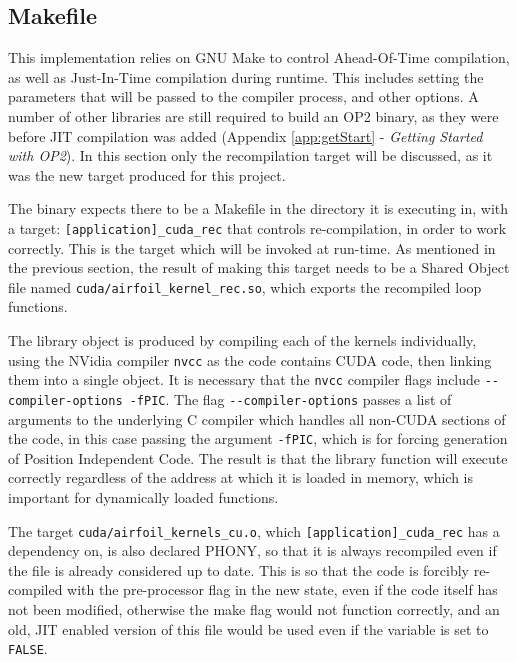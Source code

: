\subsection{Makefile}
\label{ss:make}
This implementation relies on GNU Make to control Ahead-Of-Time compilation, as well as Just-In-Time compilation during runtime. This includes setting the parameters that will be passed to the compiler process, and other options. A number of other libraries are still required to build an OP2 binary, as they were before JIT compilation was added (Appendix \ref{app:getStart} - \textit{Getting Started with OP2}). In this section only the recompilation target will be discussed, as it was the new target produced for this project.
\par
The binary expects there to be a Makefile in the directory it is executing in, with a target: \verb|[application]_cuda_rec| that controls re-compilation, in order to work correctly. This is the target which will be invoked at run-time. As mentioned in the previous section, the result of making this target needs to be a Shared Object file named \verb|cuda/airfoil_kernel_rec.so|, which exports the recompiled loop functions.
\par
The library object is produced by compiling each of the kernels individually, using the NVidia compiler \verb|nvcc| as the code contains CUDA code, then linking them into a single object. It is necessary that the \verb|nvcc| compiler flags include \verb|--compiler-options -fPIC|. The flag \verb|--compiler-options| passes a list of arguments to the underlying C compiler which handles all non-CUDA sections of the code, in this case passing the argument \verb|-fPIC|, which is for forcing generation of Position Independent Code. The result is that the library function will execute correctly regardless of the address at which it is loaded in memory, which is important for dynamically loaded functions.
\par
The target \verb|cuda/airfoil_kernels_cu.o|, which \verb|[application]_cuda_rec| has a dependency on, is also declared PHONY, so that it is always recompiled even if the file is already considered up to date. This is so that the code is forcibly re-compiled with the pre-processor flag in the new state, even if the code itself has not been modified, otherwise the make flag would not function correctly, and an old, JIT enabled version of this file would be used even if the variable is set to \verb|FALSE|.
